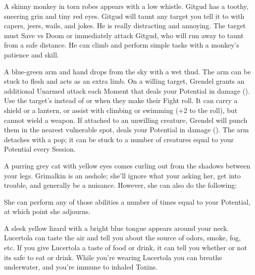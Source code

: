 {

A skinny monkey in torn robes appears with a low whistle.  Gitgud has a toothy, sneering grin and tiny red eyes.  Gitgud will taunt any target you tell it to with capers, jeers, wails, and jokes.  He is really distracting and annoying.  The target must Save vs Doom or immediately attack Gitgud, who will run away to taunt from a safe distance.  He can climb and perform simple tasks with a monkey's patience and skill.


A blue-green arm and hand drops from the sky with a wet thud.  The arm can be stuck to flesh and acts as an extra limb.  On a willing target, Grendel grants an additional Unarmed attack each Moment that deals your Potential in damage ().  Use the target's \FOC instead of \VIG or \DEX when they make their Fight roll.  It can carry a shield or a lantern, or assist with climbing or swimming (+2 to the roll), but cannot wield a weapon.  If attached to an unwilling creature, Grendel will punch them in the nearest vulnerable spot, deals your Potential in damage ().  The arm detaches with a pop;  it can be stuck to a number of creatures equal to your Potential every Session.


A purring grey cat with yellow eyes comes curling out from the shadows between your legs.  Grimalkin is an asshole; she'll ignore what your asking her, get into trouble, and generally be a nuisance.  However, she can also do the following:


She can perform any of those abilities a number of times equal to your Potential, at which point she adjourns.


A sleek yellow lizard with a bright blue tongue appears around your neck.  Lucertola can taste the air and tell you about the source of odors, smoke, fog, etc.  If you give Lucertola a taste of food or drink, it can tell you whether or not its safe to eat or drink.  While you're wearing Lucertola you can breathe underwater, and you're immune to inhaled Toxins.

}
